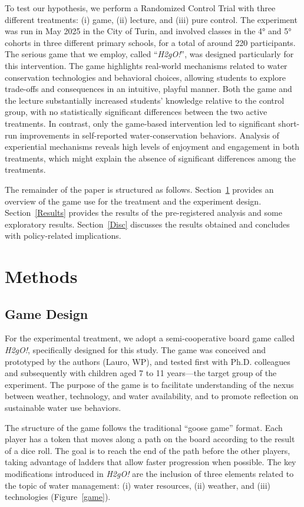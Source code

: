 \documentclass[preprint,12pt]{elsarticle}
\begin{document}
To test our hypothesis, we perform a Randomized Control Trial with three different treatments: (i) game, (ii) lecture, and (iii) pure control. The experiment was run in May 2025 in the City of Turin, and involved classes in the 4° and 5° cohorts in three different primary schools, for a total of around 220 participants. The serious game that we employ, called \enquote{\textit{H2gO!}}, was designed particularly for this intervention. The game highlights real-world mechanisms related to water conservation technologies and behavioral choices, allowing students to explore trade-offs and consequences in an intuitive, playful manner. Both the game and the lecture substantially increased students’ knowledge relative to the control group, with no statistically significant differences between the two active treatments. In contrast, only the game-based intervention led to significant short-run improvements in self-reported water-conservation behaviors. Analysis of experiential mechanisms reveals high levels of enjoyment and engagement in both treatments, which might explain the absence of significant differences among the treatments.

The remainder of the paper is structured as follows. Section~\ref{Methods} provides an overview of the game use for the treatment and the experiment design. Section~\ref{Results} provides the results of the pre-registered analysis and some exploratory results. Section~\ref{Disc} discusses the results obtained and concludes with policy-related implications.

\section{Methods}
\label{Methods}
\subsection{Game Design}
\label{GameDesign}

For the experimental treatment, we adopt a semi-cooperative board game called \textit{H2gO!}, specifically designed for this study. The game was conceived and prototyped by the authors (Lauro, WP), and tested first with Ph.D. colleagues and subsequently with children aged 7 to 11 years—the target group of the experiment. The purpose of the game is to facilitate understanding of the nexus between weather, technology, and water availability, and to promote reflection on sustainable water use behaviors.


The structure of the game follows the traditional “goose game” format. Each player has a token that moves along a path on the board according to the result of a dice roll. The goal is to reach the end of the path before the other players, taking advantage of ladders that allow faster progression when possible. The key modifications introduced in \textit{H2gO!} are the inclusion of three elements related to the topic of water management: (i) water resources, (ii) weather, and (iii) technologies (Figure~\ref{game}).
\end{document}
